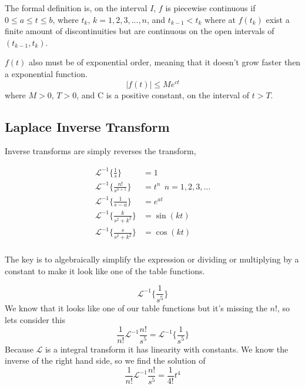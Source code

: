 The formal definition is, on the interval $I$, $f$ is piecewise continuous if $0 \leq a \leq t \leq b$,
where $t_k$, $k=1,2,3,...,n$, and $t_{k-1} < t_k$ where at $f(t_k)$ exist a finite amount of discontinuities but are continuous on the open intervals of $(t_{k-1},t_k)$.

$f(t)$ also must be of exponential order, meaning that it doesn't grow faster then a exponential function. 
\begin{equation*}
	|f(t)| \leq Me^{ct}
\end{equation*}
where $ M > 0 $, $T>0$, and C is a positive constant, on the interval of $t>T$. 

\subsection{Laplace Inverse Transform}
Inverse transforms are simply reverses the transform, 

\begin{align*}
	\mathcal{L}^{-1} \{ \frac{1}{s} \} &= 1 \\
	\mathcal{L}^{-1} \{ \frac{n!}{s^{n+1}} \} &= t^n \:\: n=1,2,3,...\\
	\mathcal{L}^{-1} \{ \frac{1}{s-a} \} &= e^{at} \\
	\mathcal{L}^{-1} \{ \frac{k}{s^2+k^2} \} &= \sin(kt) \\
	\mathcal{L}^{-1} \{  \frac{s}{s^2+k^2} \} &= \cos(kt) \\
\end{align*}

The key is to algebraically simplify the expression or dividing or multiplying by a constant to make it look like one of the table functions. 

\begin{equation*}
	\mathcal{L}^{-1} \{\frac{1}{s^5}\}
\end{equation*}
We know that it looks like one of our table functions but it's missing the $n!$, so lets consider this
\begin{equation*}
	\frac{1}{n!}\mathcal{L}^{-1} {\frac{n!}{s^5}} = \mathcal{L}^{-1} \{\frac{1}{s^5}\}
\end{equation*}
Because $\mathcal{L}$ is a integral transform it has linearity with constants. We know the inverse of the right hand side, so we find the solution of 
\begin{equation*}
	\frac{1}{n!}\mathcal{L}^{-1} {\frac{n!}{s^5}} = \frac{1}{4!}t^4
\end{equation*}
	
